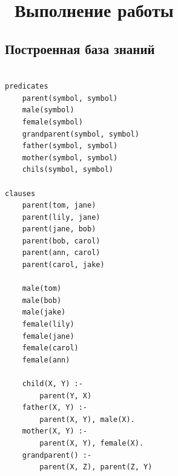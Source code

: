 \chapter{ Выполнение работы}
\label{cha:analysis}

\section{ Построенная база знаний}

\begin{lstlisting}[style=lispStyle, caption={ База знаний - "предки"},
                    label={lst:family}]

predicates
    parent(symbol, symbol)
    male(symbol)
    female(symbol)
    grandparent(symbol, symbol)
    father(symbol, symbol)
    mother(symbol, symbol)
    chils(symbol, symbol)

clauses
    parent(tom, jane)
    parent(lily, jane)
    parent(jane, bob)
    parent(bob, carol)
    parent(ann, carol)
    parent(carol, jake)

    male(tom)
    male(bob)
    male(jake)
    female(lily)
    female(jane)
    female(carol)
    female(ann)

    child(X, Y) :-
        parent(Y, X)
    father(X, Y) :-
        parent(X, Y), male(X).
    mother(X, Y) :-
        parent(X, Y), female(X).
    grandparent() :-
        parent(X, Z), parent(Z, Y)

\end{lstlisting}

\begin{figure}[ht!]
\end{figure}


